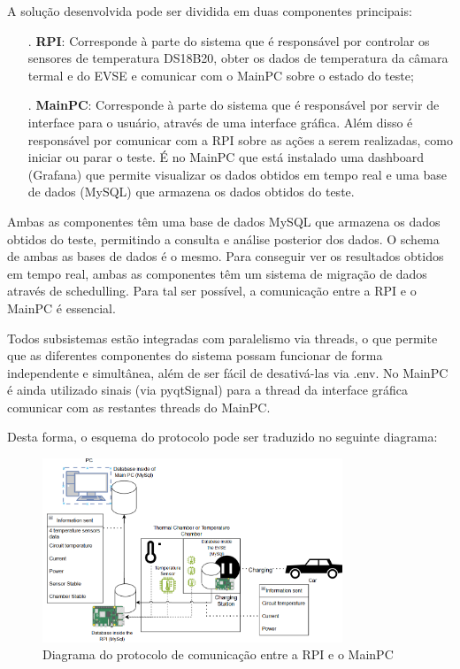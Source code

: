 A solução desenvolvida pode ser dividida em duas componentes principais: 
\begin{itemize}
    \item[.] \textbf{RPI}: Corresponde à parte do sistema que é responsável por controlar os sensores de temperatura DS18B20,
    obter os dados de temperatura da câmara termal e do EVSE e comunicar com o MainPC sobre o estado
    do teste;
    \item[.] \textbf{MainPC}: Corresponde à parte do sistema que é responsável por servir de interface
    para o usuário, através de uma interface gráfica. Além disso é responsável por comunicar com
    a RPI sobre as ações a serem realizadas, como iniciar ou parar o teste. É no MainPC que está
    instalado uma dashboard (Grafana) que permite visualizar os dados obtidos em tempo real e uma base de dados (MySQL)
    que armazena os dados obtidos do teste.
\end{itemize} 

Ambas as componentes têm uma base de dados MySQL que armazena os dados obtidos do teste, 
permitindo a consulta e análise posterior dos dados. O schema de ambas as bases de dados 
é o mesmo. Para conseguir ver os resultados obtidos em tempo real, ambas as componentes 
têm um sistema de migração de dados através de schedulling. Para tal ser possível, a comunicação
entre a RPI e o MainPC é essencial.

Todos subsistemas estão integradas com paralelismo via threads, o que permite que as diferentes 
componentes do sistema possam funcionar de forma independente e simultânea, além de ser fácil de 
desativá-las via .env. No MainPC é ainda utilizado sinais (via pyqtSignal) para a thread da 
interface gráfica comunicar com as restantes threads do MainPC. 

Desta forma, o esquema do protocolo pode ser traduzido no seguinte diagrama:
\begin{figure}[H]
    \centering
    \includegraphics[width=0.8\textwidth]{figures/protocol_diagram.png}
    \caption{Diagrama do protocolo de comunicação entre a RPI e o MainPC}
    \label{fig:diagrama_protocolo}
\end{figure}

